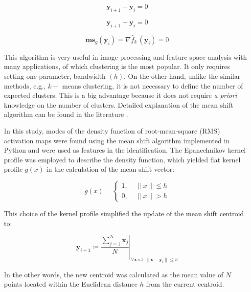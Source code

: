 \begin{equation} \label{eq:3-A12}
\mathbf{y}_{i+1} - \mathbf{y}_i = 0
\end{equation}

\begin{equation} \label{eq:3-A12}
\mathbf{y}_{i+1} - \mathbf{y}_i = 0
\end{equation}

\begin{equation} \label{eq:3-A13}
\mathbf{ms}_g (\mathbf{y}_{i}) = \nabla \hat{f}_k \, (\mathbf{y}_i) = 0
\end{equation}

This algorithm is very useful in image processing and feature space analysis with many applications, of which clustering is the most popular. It only requires setting one parameter, bandwidth $(h)$. On the other hand, unlike the similar methods, e.g., $k-$ means clustering, it is not necessary to define the number of expected clusters. This is a big advantage because it does not require \textit{a priori} knowledge on the number of clusters. Detailed explanation of the mean shift algorithm can be found in the literature \citep{Comaniciu2002, Fukunaga1975}.

In this study, modes of the density function of root-mean-square (RMS) activation maps were found using the mean shift algorithm implemented in Python \citep{scikit-learn} and were used as features in the identification. The Epanechnikov kernel profile was employed to describe the density function, which yielded flat kernel profile $g(x)$ in the calculation of the mean shift vector:

\begin{equation} \label{eq:3-A14}
g (x) = \left\{\begin{array}{lr} 1, & \,\, \parallel x \parallel \leq h \\
0,  & \,\,\parallel x \parallel > h \end{array}\right.
\end{equation}

This choice of the kernel profile simplified the update of the mean shift centroid to:

\begin{equation} \label{eq:3-A15}
\left. \mathbf{y}_{i+1} \coloneqq \frac{\sum_{j=1}^{N} \mathbf{x}_j}{N} \right\vert_{\forall \mathbf{x} \,s.t. \,\parallel \mathbf{x}-\mathbf{y}_i \parallel \leq h}
\end{equation}

In the other words, the new centroid was calculated as the mean value of $N$ points located within the Euclidean distance $h$ from the current centroid.
\clearpage


